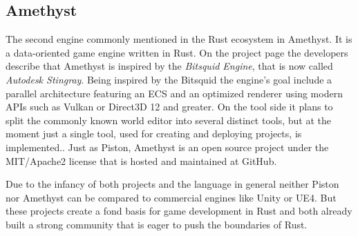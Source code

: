 \subsection{Amethyst}

The second engine commonly mentioned in the Rust ecosystem in Amethyst. It is a data-oriented game engine written in Rust. On the project page the developers describe that Amethyst is inspired by the \textit{Bitsquid Engine}, that is now called \textit{Autodesk Stingray}. Being inspired by the Bitsquid the engine's goal include a parallel architecture featuring an \ac{ECS} and an optimized renderer using modern \acp{API} such as Vulkan or Direct3D 12 and greater. On the tool side it plans to split the commonly known world editor into several distinct tools, but at the moment just a single tool, used for creating and deploying projects, is implemented.. Just as Piston, Amethyst is an open source project under the MIT/Apache2 license that is hosted and maintained at GitHub.

Due to the infancy of both projects and the language in general neither Piston nor Amethyst can be compared to commercial engines like Unity or \ac{UE4}. But these projects create a fond basis for game development in Rust and both already built a strong community that is eager to push the boundaries of Rust.